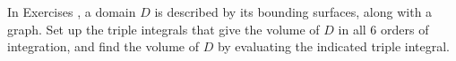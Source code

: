 {\noindent In Exercises} 
{,  a domain $D$ is described by its bounding surfaces, along with a graph. Set up the triple integrals that give the volume of $D$ in all 6 orders of integration, and find the volume of $D$ by evaluating the indicated triple integral.
}
